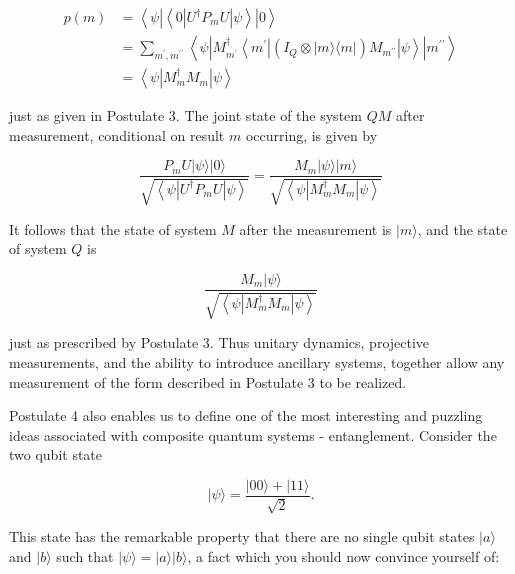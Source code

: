 \documentclass[10pt]{article}
\begin{document}
\begin{align*}
p(m) & =\left\langle\psi\left|\left\langle 0\left|U^{\dagger} P_{m} U\right| \psi\right\rangle\right| 0\right\rangle  \tag{2.127}\\
& =\sum_{m^{\prime}, m^{\prime \prime}}\left\langle\psi\left|M_{m^{\prime}}^{\dagger}\left\langle m^{\prime}\left|\left(I_{Q} \otimes|m\rangle\langle m|\right) M_{m^{\prime \prime}}\right| \psi\right\rangle\right| m^{\prime \prime}\right\rangle  \tag{2.128}\\
& =\left\langle\psi\left|M_{m}^{\dagger} M_{m}\right| \psi\right\rangle \tag{2.129}
\end{align*}


just as given in Postulate 3. The joint state of the system $Q M$ after measurement, conditional on result $m$ occurring, is given by


\begin{equation*}
\frac{P_{m} U|\psi\rangle|0\rangle}{\sqrt{\left\langle\psi\left|U^{\dagger} P_{m} U\right| \psi\right\rangle}}=\frac{M_{m}|\psi\rangle|m\rangle}{\sqrt{\left\langle\psi\left|M_{m}^{\dagger} M_{m}\right| \psi\right\rangle}} \tag{2.130}
\end{equation*}


It follows that the state of system $M$ after the measurement is $|m\rangle$, and the state of system $Q$ is


\begin{equation*}
\frac{M_{m}|\psi\rangle}{\sqrt{\left\langle\psi\left|M_{m}^{\dagger} M_{m}\right| \psi\right\rangle}} \tag{2.131}
\end{equation*}


just as prescribed by Postulate 3. Thus unitary dynamics, projective measurements, and the ability to introduce ancillary systems, together allow any measurement of the form described in Postulate 3 to be realized.

Postulate 4 also enables us to define one of the most interesting and puzzling ideas associated with composite quantum systems - entanglement. Consider the two qubit state


\begin{equation*}
|\psi\rangle=\frac{|00\rangle+|11\rangle}{\sqrt{2}} . \tag{2.132}
\end{equation*}


This state has the remarkable property that there are no single qubit states $|a\rangle$ and $|b\rangle$ such that $|\psi\rangle=|a\rangle|b\rangle$, a fact which you should now convince yourself of:
\end{document}
